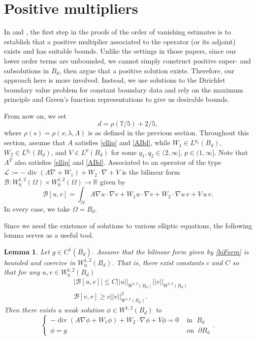 \documentclass[12pt,reqno]{amsart}
\theoremstyle{plain}
\newtheorem{lem}{Lemma}
\theoremstyle{definition}
\DeclareMathOperator{\di}{div}
\newcommand{\la}{\lambda}
\newcommand{\La}{\Lambda}
\newcommand{\Om}{\Omega}
\newcommand{\iny}{\infty}
\newcommand{\del}{ \partial}
\newcommand{\gr}{\nabla}
\newcommand{\norm}[1]{\left\vert \left\vert #1\right\vert\right\vert}
\newcommand{\brac}[1]{\left[#1\right]}
\newcommand{\pr}[1]{\left( #1 \right) }
\newcommand{\R}{\ensuremath{\mathbb{R}}}
\begin{document}
\section{Positive multipliers}
\label{S3}

In \cite{KSW15} and \cite{DKW17}, the first step in the proofs of the order of vanishing estimates is to establish that a positive multiplier associated to the operator (or its adjoint) exists and has suitable bounds.
Unlike the settings in those papers, since our lower order terms are unbounded, we cannot simply construct positive super- and subsolutions in $B_d$, then argue that a positive solution exists.
Therefore, our approach here is more involved.
Instead, we use solutions to the Dirichlet boundary value problem for constant boundary data and rely on the maximum principle and Green's function representations to give us desirable bounds.

From now on, we set
\begin{equation}
\label{drho}
d = \rho\pr{7/5} + 2/5,
\end{equation}
where $\rho\pr{s} = \rho\pr{s; \la, \La}$ is as defined in the previous section. 
Throughout this section, assume that $A$ satisfies \eqref{ellip} and \eqref{ABd}, while $W_1 \in L^{q_1}\pr{B_d}$, $W_2 \in L^{q_2}\pr{B_d}$, and $V \in L^{p}\pr{B_d}$ for some $q_1, q_2 \in (2, \iny]$, $p \in (1, \iny]$. 
Note that $A^T$ also satisfies \eqref{ellip} and \eqref{ABd}. 
Associated to an operator of the type $\mathcal{L} := - \di\pr{A \gr + W_1} + W_2 \cdot \gr + V$ is the bilinear form $\mathcal{B} : W^{1,2}_0\pr{\Om} \times W^{1,2}_0\pr{\Om} \to \R$ given by
\begin{equation}
\mathcal B\brac{u, v} = \int_{\Om} A \gr u \cdot \gr v + W_1 u \cdot \gr v + W_2\cdot \gr u  \, v + V \, u \, v.
\label{biForm}
\end{equation}
In every case, we take $\Om = B_d$.

Since we need the existence of solutions to various elliptic equations, the following lemma serves as a useful tool.

\begin{lem}
\label{solvableLem}
Let $g \in C^1\pr{\overline{B_d}}$.
Assume that the bilinear form given by \eqref{biForm} is bounded and coercive in $W^{1,2}_0\pr{B_d}$.
That is, there exist constants $c$ and $C$ so that for any $u, v \in W^{1,2}_0\pr{B_d}$
\begin{align*}
&|\mathcal B\brac{u, v}| \le C \norm{u}_{W^{1,2}\pr{B_d}} \norm{v}_{W^{1,2}\pr{B_d}} \\
&\mathcal B\brac{v, v} \ge c \norm{v}_{W^{1,2}\pr{B_d}}^2.
\end{align*}
Then there exists a weak solution $\phi \in W^{1,2}\pr{B_d}$ to 
\begin{equation}
\left\{\begin{array}{rl} - \di \pr{A \gr \phi + W_1 \phi} + W_2 \cdot \gr \phi + V \phi = 0 & \text{ in }\; B_d \\ \phi = g & \text{ on }\; \del B_d \end{array} \right..
\label{BVP1}
\end{equation}
\end{lem}
\end{document}
